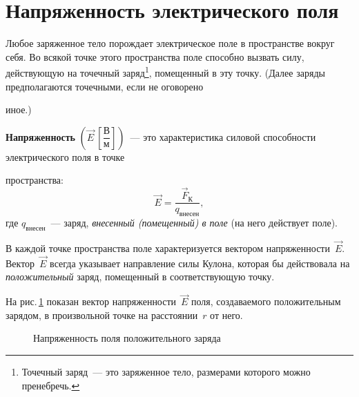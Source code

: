 \documentclass[main.tex]{subfiles}
\begin{document}

\pagestyle{empty}

 

\setcounter{section}{6
}
\addtocounter{section}{-1} 

\section{Напряженность электрического поля}




Любое заряженное тело порождает электрическое поле в пространстве вокруг себя. Во всякой точке этого пространства поле способно вызвать силу, действующую на точечный заряд\footnote{Точечный заряд~--- это заряженное тело, размерами которого можно пренебречь.}, помещенный в эту точку. 
(Далее заряды предполагаются точечными, если не оговорено \strut иное.)

\textbf{Напряженность} $\left(\vec E\ \left[\dfrac{\text{В}}{\text{м}}\right]\right)$~--- это характеристика силовой способности электрического поля в точке \strut пространства:
\begin{equation}
    \label{e27}
    \vec E=\frac{\vec F_\text{К}}{q_\text{внесен}},
\end{equation}
где $q_\text{внесен}$~--- заряд, \emph{внесенный (помещенный) в поле} (на него действует поле).

В каждой точке пространства поле характеризуется вектором напряженности~$\vec E$. Вектор~$\vec E$ всегда указывает направление силы Кулона, которая бы действовала на \emph{положительный} заряд, помещенный в соответствующую точку.

На рис.\,\ref{fig:p98} показан вектор напряженности~$\vec E$ поля, создаваемого положительным зарядом, в произвольной точке на расстоянии~$r$ от него. 

    \begin{figure}[H]
    \centering

\caption{Напряженность поля положительного заряда}
\label{fig:p98}
\end{figure}
\end{document}
